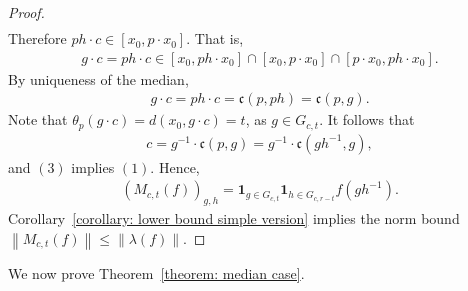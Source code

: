 \documentclass[12pt,reqno]{amsart}
\newcommand{\norm}[1]{\left\|#1\right\|}
\numberwithin{equation}{section}
\begin{document}
\begin{proof}
\begin{align*}
    \end{align*}
    Therefore $ph\cdot c\in [x_0,p\cdot x_0]$. That is,
    \begin{align*}
        g\cdot c=ph\cdot c\in [x_0,ph\cdot x_0]\cap [x_0,p\cdot x_0]\cap [p\cdot x_0, ph\cdot x_0].
    \end{align*}
    By uniqueness of the median,
    \begin{align*}
        g\cdot c=ph\cdot c=\mathfrak{c}(p,ph)=\mathfrak{c}(p,g).
    \end{align*}
    Note that $\theta_p(g\cdot c)=d(x_0,g\cdot c)=t$, as $g\in G_{c,t}$. It follows that
    \begin{align*}
        c=g^{-1}\cdot \mathfrak{c}(p,g)=g^{-1}\cdot \mathfrak{c}(gh^{-1},g),
    \end{align*}
    and $(3)$ implies $(1)$.
    Hence,
    \begin{align*}
        (M_{c,t}(f))_{g,h}=\mathbf{1}_{g\in G_{c,t}}\mathbf{1}_{h\in G_{c,r-t}}f(gh^{-1}).
    \end{align*}
    Corollary~\ref{corollary: lower bound simple version} implies the norm bound $\norm{M_{c,t}(f)}\le \norm{\lambda(f)}$.
\end{proof}
We now prove Theorem~\ref{theorem: median case}.
\end{document}
